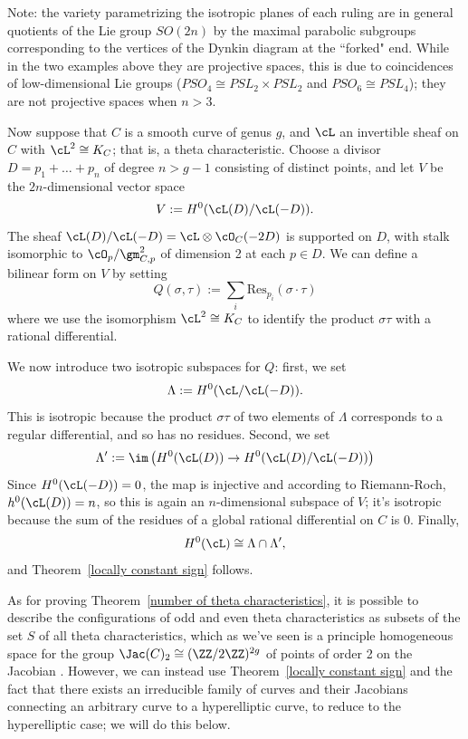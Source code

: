 Note: the variety parametrizing the isotropic planes of each ruling are in general quotients of the Lie group $SO(2n)$ by the maximal parabolic subgroups corresponding to the vertices of the Dynkin diagram at the ``forked" end. While in the two examples above they are projective spaces, this is due to coincidences of low-dimensional Lie groups ($PSO_4 \cong PSL_2 \times PSL_2$ and $PSO_6 \cong PSL_4$); they are not projective spaces when $n > 3$.

Now suppose that $C$ is a smooth curve of genus $g$, and $\cL$ an invertible sheaf on $C$ with $\cL^2 \cong K_C$; that is, a theta characteristic. Choose a divisor $D = p_1 + \dots + p_n$ of degree $n> g-1$ consisting of distinct points, and let $V$ be the $2n$-dimensional vector space
$$
V := H^0( \cL(D) / \cL(-D) ).
$$
The sheaf $ \cL(D) / \cL(-D) = \cL \otimes \cO_C(-2D) $ is supported on $D$, with stalk 
isomorphic to $\cO_p/\gm_{C,p}^2$ of dimension 2 at each $p \in D$. We can define a bilinear form on $V$ by setting
$$
Q(\sigma, \tau) := \sum_i \text{Res}_{p_i}(\sigma \cdot \tau)
$$
where we use the isomorphism $\cL^2 \cong K_C$ to identify the product $\sigma\tau$ with a rational differential.

We now introduce two isotropic subspaces for $Q$: first, we set
$$
\Lambda := H^0( \cL / \cL(-D) ).
$$
This is isotropic because the product $\sigma\tau$ of two elements of $\Lambda$ corresponds to a regular differential, and so has no residues.  Second, we set
$$
\Lambda' := \im\left( H^0(\cL(D)) \to H^0( \cL(D) / \cL(-D) ) \right)
$$
Since  $H^0(\cL(-D)) = 0$, the map is injective and according to Riemann-Roch, $h^0(\cL(D)) = n$, so this is again an $n$-dimensional subspace of $V$; it's isotropic because the sum of the residues of a global rational differential on $C$ is 0. Finally, 
$$
H^0(\cL) \cong \Lambda \cap \Lambda',
$$
and Theorem~\ref{locally constant sign} follows.

As for proving Theorem~\ref{number of theta characteristics}, it is possible to describe the configurations of odd and even theta characteristics as subsets of the set $S$ of all theta characteristics, which as we've seen is a principle homogeneous space for the group $\Jac(C)_2 \cong (\ZZ/2\ZZ)^{2g}$ of points of order 2 on the Jacobian \cite{JHPaper}. However, we can instead use
Theorem~\ref{locally constant sign} and the fact that there exists an irreducible family of 
curves and their Jacobians connecting an arbitrary curve to a hyperelliptic curve, to reduce to the hyperelliptic case; we will do this below.

